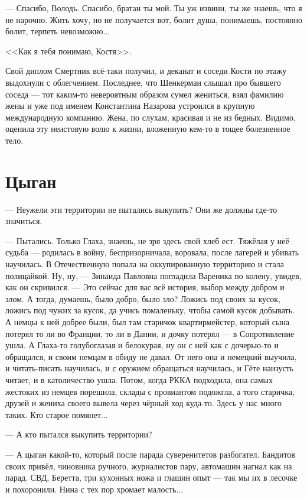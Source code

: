 \documentclass[a4paper,10pt,fleqn]{book}\usepackage{polyglossia}\setdefaultlanguage{english}\setotherlanguage{russian}\defaultfontfeatures{Ligatures=TeX,Mapping=tex-text} \usepackage{xcolor}\definecolor{lightgray}{HTML}{bbbbbb}\color{lightgray}\newcommand{\ml}[3]{\textcolor{black}{#3}}
\begin{document}
--- Спасибо, Володь.
Спасибо, братан ты мой.
Ты уж извини, ты же знаешь, что я не нарочно.
Жить хочу, но не получается вот, болит душа, понимаешь, постоянно болит, терпеть невозможно...

<<Как я тебя понимаю, Костя>>.

Свой диплом Смертник всё-таки получил, и деканат и соседи Кости по этажу выдохнули с облегчением.
Последнее, что Шенкерман слышал про бывшего соседа --- тот каким-то невероятным образом сумел жениться, взял фамилию жены и уже под именем Константина Назарова устроился в крупную международную компанию.
Жена, по слухам, красивая и не из бедных.
Видимо, оценила эту неистовую волю к жизни, вложенную кем-то в тощее болезненное тело.

\section{Цыган}

--- Неужели эти территории не пытались выкупить?
Они же должны где-то значиться.

--- Пытались.
Только Глаха, знаешь, не зря здесь свой хлеб ест.
Тяжёлая у неё судьба --- родилась в войну, беспризорничала, воровала, после лагерей и убивать научилась.
В Отечественную попала на оккупированную территорию и стала полицайкой.
Ну, ну, --- Зинаида Павловна погладила Вареника по колену, увидев, как он скривился.
--- Это сейчас для вас всё история, выбор между добром и злом.
А тогда, думаешь, было добро, было зло?
Ложись под своих за кусок, ложись под чужих за кусок, да учись помаленьку, чтобы самой кусок добывать.
А немцы к ней добрее были, был там старичок квартирмейстер, который сына потерял то ли во Франции, то ли в Дании, и дочку потерял --- в Сопротивление ушла.
А Глаха-то голубоглазая и белокурая, ну он с ней как с дочерью-то и обращался, и своим немцам в обиду не давал.
От него она и немецкий выучила, и читать-писать научилась, и с оружием обращаться научилась, и Гёте наизусть читает, и в католичество ушла.
Потом, когда РККА подходила, она самых жестоких из немцев порешила, склады с провиантом подожгла, а того старичка, друзей и жениха своего вывела через чёрный ход куда-то.
Здесь у нас много таких.
Кто старое помянет...

--- А кто пытался выкупить территории?

--- А цыган какой-то, который после парада суверенитетов разбогател.
Бандитов своих привёл, чиновника ручного, журналистов пару, автомашин нагнал как на парад.
СВД, Беретта, три кухонных ножа и глашин опыт --- так мы их в лесочке и похоронили.
Нина с тех пор хромает малость...
\end{document}

